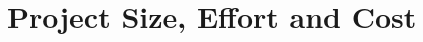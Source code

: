 \documentclass[../../projectPlan.tex]{subfiles}
\begin{document}
	\chapter{Project Size, Effort and Cost}	

		

		

		
\end{document}
